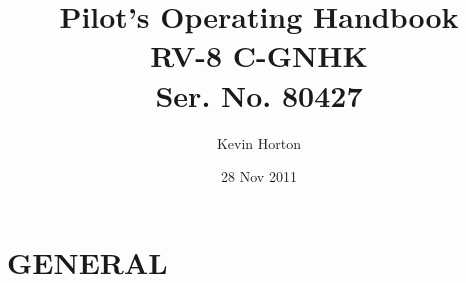 \title{Pilot's Operating Handbook\\
[1in]RV-8 C-GNHK\\
[0.25in]Ser. No. 80427}

\author{Kevin Horton}

\date{28 Nov 2011}

\maketitle \clearpage

\cleardoublepage \setcounter{tocdepth}{0} 

\tableofcontents{}

\clearpage

\mainmatter

\chapter{GENERAL} \vspace{\minitocspacebefore} \minitoc \clearpage


